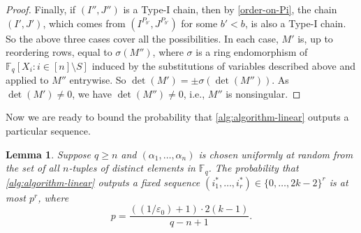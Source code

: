 \documentclass[11pt]{article}
\theoremstyle{plain}
\newtheorem{lemma}[thm]{Lemma}
\theoremstyle{definition}
\theoremstyle{remark}
\newcommand{\F}{\mathbb{F}}
\newcommand{\eps}{\varepsilon}
\newcommand{\Fq}{\mathbb{F}_q}
\begin{document}
\begin{proof}
Finally, if $(I'', J'')$ is a Type-I chain, then by \cref{order-on-Pi}, the chain $(I',J')$, which comes from $(I^{P_{b'}}, J^{P_{b'}})$ for some $b'<b$, is also a Type-I chain. So the above three cases cover all the possibilities.
In each case, $M'$ is, up to reordering rows, equal to $\sigma(M'')$, where $\sigma$ is a ring endomorphism of $\Fq[X_i: i\in [n]\setminus S]$ induced by the substitutions of variables described above and applied to $M''$ entrywise.
So $\det(M')=\pm \sigma(\det(M''))$.
As $\det(M')\neq 0$, we have $\det(M'')\neq 0$, i.e., $M''$ is nonsingular. 
\end{proof}

Now we are ready to bound the probability that \cref{alg:algorithm-linear} outputs a particular sequence.

\begin{lemma}\label{lastlem}
Suppose $q\geq n$ and $(\alpha_1,\dots,\alpha_n)$ is chosen uniformly at random from the set of all $n$-tuples of distinct elements in $\F_q$. 
The probability that \cref{alg:algorithm-linear} outputs a fixed sequence $(i_1^*,\dots,i_r^*)\in \{0,\dots,2k-2\}^r$ is at most $p^r$, where
\[
p=\frac{((1/\eps_0)+1)\cdot 2(k-1)}{q-n+1}.
\]
\end{lemma}
\end{document}
